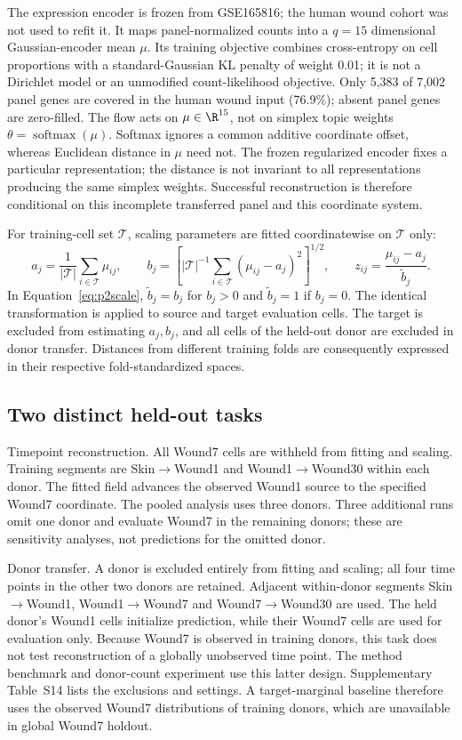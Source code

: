 \documentclass[10pt,a4paper]{article}
\begin{document}
The expression encoder is frozen from GSE165816; the human wound cohort was not used to refit it. It maps panel-normalized counts into a $q=15$ dimensional Gaussian-encoder mean $\mu$. Its training objective combines cross-entropy on cell proportions with a standard-Gaussian KL penalty of weight 0.01; it is not a Dirichlet model or an unmodified count-likelihood objective. Only 5,383 of 7,002 panel genes are covered in the human wound input (76.9\%); absent panel genes are zero-filled. The flow acts on $\mu\in\R^{15}$, not on simplex topic weights $\theta=\operatorname{softmax}(\mu)$. Softmax ignores a common additive coordinate offset, whereas Euclidean distance in $\mu$ need not. The frozen regularized encoder fixes a particular representation; the distance is not invariant to all representations producing the same simplex weights. Successful reconstruction is therefore conditional on this incomplete transferred panel and this coordinate system.

For training-cell set $\mathcal T$, scaling parameters are fitted coordinatewise on $\mathcal T$ only:
\begin{equation}
a_j=\frac1{|\mathcal T|}\sum_{i\in\mathcal T}\mu_{ij},\qquad
b_j=\left[|\mathcal T|^{-1}\sum_{i\in\mathcal T}(\mu_{ij}-a_j)^2\right]^{1/2},\qquad
z_{ij}=\frac{\mu_{ij}-a_j}{\widetilde b_j}.\label{eq:p2scale}
\end{equation}
In Equation~\eqref{eq:p2scale}, $\widetilde b_j=b_j$ for $b_j>0$ and $\widetilde b_j=1$ if $b_j=0$. The identical transformation is applied to source and target evaluation cells. The target is excluded from estimating $a_j,b_j$, and all cells of the held-out donor are excluded in donor transfer. Distances from different training folds are consequently expressed in their respective fold-standardized spaces.

\subsection{Two distinct held-out tasks}
Timepoint reconstruction. All Wound7 cells are withheld from fitting and scaling. Training segments are Skin$\rightarrow$Wound1 and Wound1$\rightarrow$Wound30 within each donor. The fitted field advances the observed Wound1 source to the specified Wound7 coordinate. The pooled analysis uses three donors. Three additional runs omit one donor and evaluate Wound7 in the remaining donors; these are sensitivity analyses, not predictions for the omitted donor.

Donor transfer. A donor is excluded entirely from fitting and scaling; all four time points in the other two donors are retained. Adjacent within-donor segments Skin$\rightarrow$Wound1, Wound1$\rightarrow$Wound7 and Wound7$\rightarrow$Wound30 are used. The held donor's Wound1 cells initialize prediction, while their Wound7 cells are used for evaluation only. Because Wound7 is observed in training donors, this task does not test reconstruction of a globally unobserved time point. The method benchmark and donor-count experiment use this latter design. Supplementary Table~S14 lists the exclusions and settings. A target-marginal baseline therefore uses the observed Wound7 distributions of training donors, which are unavailable in global Wound7 holdout.
\end{document}
